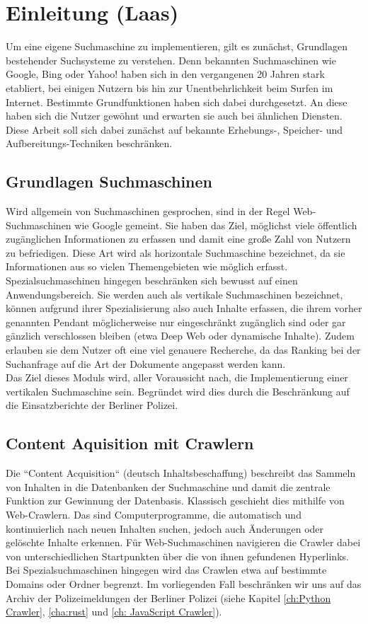 \chapter{Einleitung \small(Laas)}
Um eine eigene Suchmaschine zu implementieren, gilt es zunächst, Grundlagen bestehender Suchsysteme zu verstehen. Denn bekannten Suchmaschinen wie Google, Bing oder Yahoo! haben sich in den vergangenen 20 Jahren stark etabliert, bei einigen Nutzern bis hin zur Unentbehrlichkeit beim Surfen im Internet. Bestimmte Grundfunktionen haben sich dabei durchgesetzt. An diese haben sich die Nutzer gewöhnt und erwarten sie auch bei ähnlichen Diensten. Diese Arbeit soll sich dabei zunächst auf bekannte Erhebungs-, Speicher- und Aufbereitungs-Techniken beschränken.

\section{Grundlagen Suchmaschinen}
Wird allgemein von Suchmaschinen gesprochen, sind in der Regel Web-Suchmaschinen wie Google gemeint. Sie haben das Ziel, möglichst viele öffentlich zugänglichen Informationen zu erfassen und damit eine große Zahl von Nutzern zu befriedigen. Diese Art wird als horizontale Suchmaschine bezeichnet, da sie Informationen aus so vielen Themengebieten wie möglich erfasst.\\
Spezialsuchmaschinen hingegen beschränken sich bewusst auf einen Anwendungsbereich. Sie werden auch als vertikale Suchmaschinen bezeichnet, können aufgrund ihrer Spezialisierung also auch Inhalte erfassen, die ihrem vorher genannten Pendant möglicherweise nur eingeschränkt zugänglich sind oder gar gänzlich verschlossen bleiben (etwa Deep Web oder dynamische Inhalte). Zudem erlauben sie dem Nutzer oft eine viel genauere Recherche, da das Ranking bei der Suchanfrage auf die Art der Dokumente angepasst werden kann. \cite{suchmverst} \cite{boldsuche}\\
Das Ziel dieses Moduls wird, aller Voraussicht nach, die Implementierung einer vertikalen Suchmaschine sein. Begründet wird dies durch die Beschränkung auf die Einsatzberichte der Berliner Polizei.

\section{Content Aquisition mit Crawlern}
Die ``Content Acquisition`` (deutsch Inhaltsbeschaffung) beschreibt das Sammeln von Inhalten in die Datenbanken der Suchmaschine und damit die zentrale Funktion zur Gewinnung der Datenbasis. Klassisch geschieht dies mithilfe von Web-Crawlern. Das sind Computerprogramme, die automatisch und kontinuierlich nach neuen Inhalten suchen, jedoch auch Änderungen oder gelöschte Inhalte erkennen. Für Web-Suchmaschinen navigieren die Crawler dabei von unterschiedlichen Startpunkten über die von ihnen gefundenen Hyperlinks. Bei Spezialsuchmaschinen hingegen wird das Crawlen etwa auf bestimmte Domains oder Ordner begrenzt. Im vorliegenden Fall beschränken wir uns auf das Archiv der Polizeimeldungen der Berliner Polizei (siehe Kapitel \ref{ch:Python Crawler}, \ref{cha:rust} und \ref{ch: JavaScript Crawler}). \cite{suchmverst}

